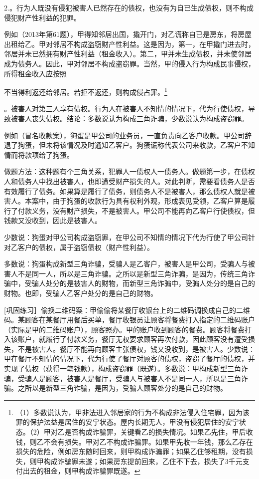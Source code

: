 2.。行为人既没有侵犯被害人已然存在的债权，也没有为自已生成债权，则不构成侵犯财产性利益的犯罪。

例如（2013年第61题），甲得知邻居出国，撬开门，对乙谎称自已是房东，将房屋出租给乙。甲对邻居不构成盗窃财产性利益。这是因为，第一，在甲撬门进去时，邻居并未已然拥有财产性利益（租金收入）。第二，甲并未生成债权，并未使邻居成为债务人。因此，甲对邻居不构成盗窃罪。当然，甲的侵入行为构成民事侵权，所得租金收入应按照

不当得利返还给邻居。若拒不返还，则构成侵占罪。\footnote{（1）多数说认为，甲非法进入邻居家的行为不构成非法侵入住宅罪，因为该罪的保护法益是居住的安宁状态。屋内长期无人，甲没有侵犯居住的安宁状态。（2）甲对乙是否构成诈骗罪，关键看乙的损失情况。如果乙先住，甲后收钱，则乙不会有损失。甲对乙不构成诈骗罪。如果甲先收一年钱，那么乙存在损失的危险，例如房东随时回来，则甲构成诈骗罪；如果乙住够租期，没有损失，则甲构成诈骗罪未遂；如果房东提前回来，乙住不下去，损失了3千元支付出去的租金，则甲构成诈骗罪既遂。}

。被害人对第三人享有债权。行为人在被害人不知情的情况下，代为行使债权，导致被害人丧失债权。结论：多数说认为构成三角诈骗，少数说认为构成盗窃罪。

例如（冒名收款案），狗蛋是甲公司的业务员，一直负责向乙客户收款。甲公司辞退了狗蛋，但未将该情况及时通知乙客户。狗蛋谎称代表公司来收款，乙客户不知情而将款项给了狗蛋。

做题方法：这种题有个三角关系，犯罪人一债权人一债务人。做题第一步，在债权人和债务人中找出被害人，也即遭受财产损失的人。对此判断，需要看债务人是否有效履行了债务。如果算是履行了债务，则债务人不是被害人，那么债权人就是被害人。本案中，由于狗蛋的收款行为具有权利外观，形成表见受领，乙客户算是履行了付款义务，没有财产损失，不是被害人。甲公司不能再向乙客户行使债权，但钱款又没收到，因此是被害人。

少数说：狗蛋对甲公司构成盗窃罪，在甲公司不知情的情况下代为行使了甲公司针对乙客户的债权，属于盗窃债权（财产性利益）。

多数说：狗蛋构成新型三角诈骗，受骗人是乙客户，被害人是甲公司，受骗人与被害人不是同一人，所以是三角诈骗。之所以是新型三角诈骗，是因为，传统三角诈骗中，受骗人处分的是被害人的财物，而新型三角诈骗中，受骗人处分的是自己的财物。也即，受骗人乙客户处分的是自己的财物。

[巩固练习］偷换二维码案：甲偷偷将某餐厅收银台上的二维码调换成自己的二维码。某顾客在某餐厅用餐后买单，餐厅收银员让顾客将餐费打入指定的二维码账户（实际是甲的二维码账户），顾客照办。甲的账户收到顾客的餐费。顾客将餐费打入该账户，就履行了付款义务，餐厅无权要求顾客再次付款，因此顾客没有遭受损失，不是被害人。餐厅不能再向顾客主张债权，钱又没收到，是被害人。少数说：甲在餐厅不知情的情况下，代为行使了餐厅对顾客的债权，盗窃了餐厅的债权，并实现了债权（获得一笔钱款），构成盗窃罪（既遂）。多数说：甲构成新型三角诈骗，受骗人是顾客，被害人是餐厅，受骗人与被害人不是同一人，所以是三角诈骗。之所以是新型三角诈骗，是因为，受骗人顾客处分的是自己的财物。

